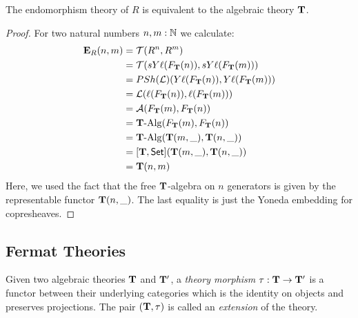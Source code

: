 {\begin{proposition}
  The endomorphism theory of \(R\) is equivalent to the algebraic theory \(\mathbf{T}\).
\end{proposition}
\begin{proof}
  For two natural numbers \(n,m:\mathbb{N}\) we calculate:
  \begin{align*}
    \mathbf{E}_R(n,m)
    &= \mathcal{T}(R^n,R^m)\\
    &= \mathcal{T}(sY\ell(F_{\mathbf{T}}(n)),sY\ell(F_{\mathbf{T}}(m)))\\
    &= \mathop{PSh}(\mathcal{L})(Y\ell(F_{\mathbf{T}}(n)),Y\ell(F_{\mathbf{T}}(m)))\\
    &= \mathcal{L}(\ell(F_{\mathbf{T}}(n)),\ell(F_{\mathbf{T}}(m)))\\
    & = \mathcal{A}(F_{\mathbf{T}}(m),F_{\mathbf{T}}(n))\\
    & = \mathbf{T}\text{-}\mathrm{Alg}(F_{\mathbf{T}}(m),F_{\mathbf{T}}(n))\\
    & = \mathbf{T}\text{-}\mathrm{Alg}(\mathbf{T}(m,\_),\mathbf{T}(n,\_))\\
    & = [\mathbf{T},\mathsf{Set}](\mathbf{T}(m,\_),\mathbf{T}(n,\_))\\
    & = \mathbf{T}(n,m)
  \end{align*}
Here, we used the fact that the free \(\mathbf{T}\)-algebra on \(n\) generators is given by the representable functor \(\mathbf{T}(n,\_)\).
The last equality is just the Yoneda embedding for copresheaves.
\end{proof}


\subsection{Fermat Theories}

Given two algebraic theories \(\mathbf{T}\) and \(\mathbf{T}'\), a \emph{theory morphism} \(\tau:\mathbf{T}\to\mathbf{T}'\) is a functor between their underlying categories which is the identity on objects and preserves projections.
The pair \((\mathbf{T},\tau)\) is called an \emph{extension} of the theory.


}

